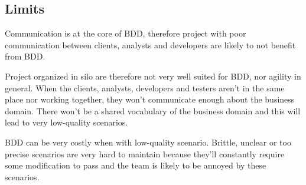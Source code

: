 \subsection{Limits}\label{subsec:limits}

Communication is at the core of BDD, therefore project with poor
communication between clients, analysts and developers are likely to not
benefit from BDD\@.

Project organized in silo are therefore not very well suited for BDD, nor
agility in general.
When the clients, analysts, developers and testers aren't in the same place
nor working together, they won't communicate enough about the business domain.
There won't be a shared vocabulary of the business domain and this will lead
to very low-quality scenarios.

BDD can be very costly when with low-quality scenario.
Brittle, unclear or too precise scenarios are very hard to maintain because
they'll constantly require some modification to pass and the team is likely
to be annoyed by these scenarios.
